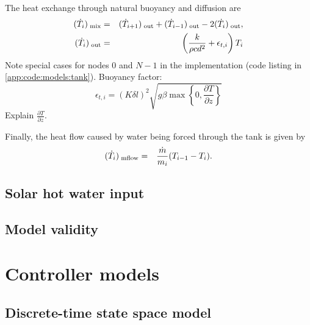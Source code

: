 The heat exchange through natural buoyancy and diffusion are
\begin{eqnarray}
   \label{eq:flow-mix}
   \flow{mix} &=& \flow[i+1]{out} + \flow[i-1]{out} - 2 \flow{out}, \\
   \label{eq:flow-mix-out}
   \flow{out} &=& \left(\frac{k}{\rho c d^2} + \epsilon_{t, i}\right)T_i
\end{eqnarray}
Note special cases for nodes 0 and $N-1$ in the implementation (code listing in \autoref{app:code:models:tank}).
Buoyancy factor:
\begin{equation}
   \label{eq:epsilon}
   \epsilon_{t, i} = (K \delta l)^2 \sqrt{g \beta \max \left\{ 0, \frac{\partial T}{\partial z}\right\}}
\end{equation}
Explain $\frac{\partial T}{\partial z}$.

Finally, the heat flow caused by water being forced through the tank is given by
\begin{eqnarray}
   \label{eq:flow-mflow}
   \flow{mflow} &=& \frac{\dot{m}}{m_i} (T_{i-1} - T_i).
\end{eqnarray}

\subsection{Solar hot water input}

\subsection{Model validity}

\section{Controller models}

\subsection{Discrete-time state space model}

